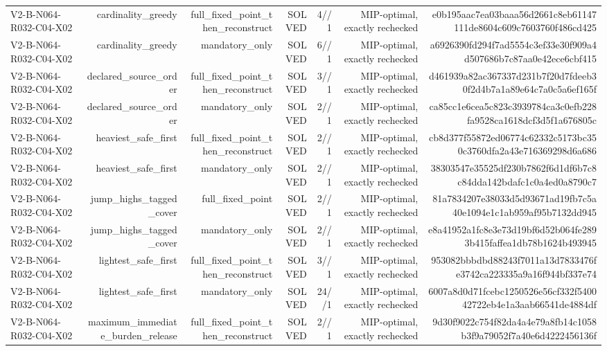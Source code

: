{\begin{longtable}{lrrrrrr}
V2-B-N064-R032-C04-X02 & cardinality\_greedy & full\_fixed\_point\_then\_reconstruct & SOLVED & 4//1 & MIP-optimal, exactly rechecked & e0b195aac7ea03baaa56d2661c8eb61147111de8604c609c7603760f486cd425 \\
V2-B-N064-R032-C04-X02 & cardinality\_greedy & mandatory\_only & SOLVED & 6//1 & MIP-optimal, exactly rechecked & a6926390fd294f7ad5554c3ef33e30f909a4d507686b7c87aa0e42ece6cbf415 \\
V2-B-N064-R032-C04-X02 & declared\_source\_order & full\_fixed\_point\_then\_reconstruct & SOLVED & 3//1 & MIP-optimal, exactly rechecked & d461939a82ac367337d231b7f20d7fdeeb30f2d4b7a1a89e64c7a0c5a6ef165f \\
V2-B-N064-R032-C04-X02 & declared\_source\_order & mandatory\_only & SOLVED & 2//1 & MIP-optimal, exactly rechecked & ca85cc1e6cea5c823c3939784ca3c0efb228fa9528ca1618dcf3d5f1a676805c \\
V2-B-N064-R032-C04-X02 & heaviest\_safe\_first & full\_fixed\_point\_then\_reconstruct & SOLVED & 2//1 & MIP-optimal, exactly rechecked & cb8d377f55872ed06774c62332c5173bc350c3760dfa2a43e716369298d6a686 \\
V2-B-N064-R032-C04-X02 & heaviest\_safe\_first & mandatory\_only & SOLVED & 2//1 & MIP-optimal, exactly rechecked & 38303547e35525df230b7862f6d1df6b7c8c84dda142bdafc1c0a4ed0a8790c7 \\
V2-B-N064-R032-C04-X02 & jump\_highs\_tagged\_cover & full\_fixed\_point & SOLVED & 2//1 & MIP-optimal, exactly rechecked & 81a7834207e38033d5d93671ad19fb7c5a40e1094e1c1ab959af95b7132dd945 \\
V2-B-N064-R032-C04-X02 & jump\_highs\_tagged\_cover & mandatory\_only & SOLVED & 2//1 & MIP-optimal, exactly rechecked & e8a41952a1fc8e3e73d19bf6d52b064fe2893b415faffea1db78b1624b493945 \\
V2-B-N064-R032-C04-X02 & lightest\_safe\_first & full\_fixed\_point\_then\_reconstruct & SOLVED & 3//1 & MIP-optimal, exactly rechecked & 953082bbbdbd88243f7011a13d7833476fe3742ca223335a9a16f944bf337e74 \\
V2-B-N064-R032-C04-X02 & lightest\_safe\_first & mandatory\_only & SOLVED & 24//1 & MIP-optimal, exactly rechecked & 6007a8d0d71fcebc1250526e56cf332f540042722eb4e1a3aab66541de4884df \\
V2-B-N064-R032-C04-X02 & maximum\_immediate\_burden\_release & full\_fixed\_point\_then\_reconstruct & SOLVED & 2//1 & MIP-optimal, exactly rechecked & 9d30f9022c754f82da4a4e79a8fb14c1058b3f9a79052f7a40e6d4222456136f \\

\end{longtable}}
